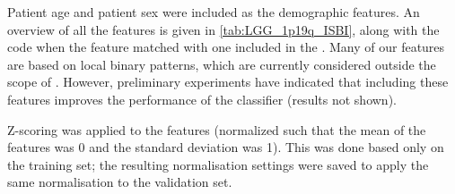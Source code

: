 \begin{subappendices}
Patient age and patient sex were included as the demographic features.
An overview of all the features is given in \cref{tab:LGG_1p19q_ISBI}, along with the  code when the feature matched with one included in the  \autocite{zwanenburg2016image}.
Many of our features are based on local binary patterns, which are currently considered outside the scope of .
However, preliminary experiments have indicated that including these features improves the performance of the classifier (results not shown).

Z-scoring was applied to the features (normalized such that the mean of the features was 0 and the standard deviation was 1).
This was done based only on the training set; the resulting normalisation settings were saved to apply the same normalisation to the validation set.


\end{subappendices}
